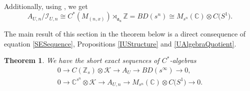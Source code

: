 \documentclass[pdftex]{sigma}
\newcommand{\C}{{\mathbb C}}
\newcommand{\Z}{{\mathbb Z}}
\newcommand{\fancyI}{\mathcal{I}}
\numberwithin{equation}{section}
\newtheorem{Theorem}{Theorem}[section]
\begin{document}
Additionally, using \cite[Proposition 2.9]{KMRSW2}, we get
\begin{equation*}
A_{U,n}/\fancyI_{U,n}\cong C^*(M_{(n,x)})\rtimes_{\mathfrak{a}_u} \Z = BD(s^n)\cong M_{s^n}(\C)\otimes C\bigl(S^1\bigr).
\end{equation*}

The main result of this section in the theorem below is a direct consequence of equation \eqref{SESequence}, Propositions \ref{IUStructure} and \ref{UAlgebraQuotient}.
\begin{Theorem}
We have the short exact sequences of $C^*$-algebras
\begin{gather}
0\rightarrow C(\Z_s)\otimes\mathcal{K}\rightarrow A_U\rightarrow BD(s^\infty)\rightarrow 0,\nonumber
\\
0 \to \C^{s^n}\otimes \mathcal{K}\to A_{U,n} \to M_{s^n}(\C)\otimes C\bigl(S^1\bigr) \to 0.\label{AUExact}
\end{gather}
\end{Theorem}
\end{document}
